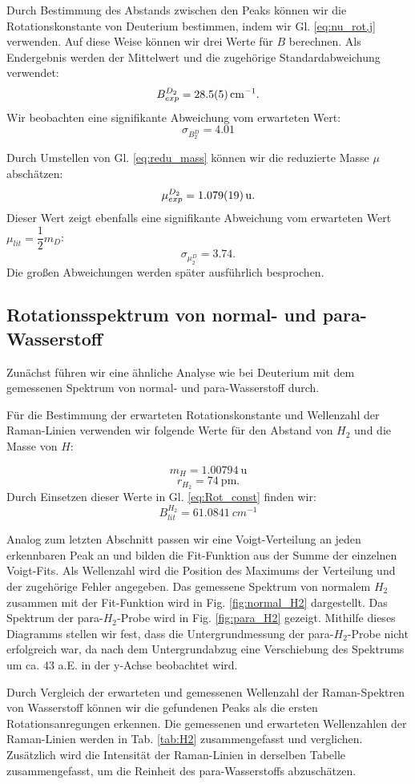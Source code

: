 \documentclass[11pt]{article}
\begin{document}
Durch Bestimmung des Abstands zwischen den Peaks können wir die Rotationskonstante von Deuterium bestimmen, indem wir Gl. \ref{eq:nu_rot,j} verwenden. Auf diese Weise können wir drei Werte für $B$ berechnen. Als Endergebnis werden der Mittelwert und die zugehörige Standardabweichung verwendet: 
$$B_{exp}^{D_2} = \SI{28.5\pm 0.5}{cm^{-1}}.$$
Wir beobachten eine signifikante Abweichung vom erwarteten Wert:
$$\sigma_{B^D_2} = 4.01$$ 
 
Durch Umstellen von Gl. \ref{eq:redu_mass} können wir die reduzierte Masse $\mu$ abschätzen:
$$\mu_{exp}^{D_2} = \SI{1.079\pm 0.019}{\atomicmassunit}.$$
Dieser Wert zeigt ebenfalls eine signifikante Abweichung vom erwarteten Wert $\mu_{lit} = \dfrac{1}{2}m_D$:
$$\sigma_{\mu^D_2} = 3.74.$$
Die großen Abweichungen werden später ausführlich besprochen.

\subsection{Rotationsspektrum von normal- und para-Wasserstoff}
Zunächst führen wir eine ähnliche Analyse wie bei Deuterium mit dem gemessenen Spektrum von normal- und para-Wasserstoff durch.

Für die Bestimmung der erwarteten Rotationskonstante und Wellenzahl der Raman-Linien verwenden wir folgende Werte für den Abstand von $H_2$ und die Masse von $H$:

$$m_{H} =\SI{1.00794}{\atomicmassunit}$$
$$r_{H_2} = \SI{74}{\pm}.$$
Durch Einsetzen dieser Werte in Gl. \ref{eq:Rot_const} finden wir:
$$B_{lit}^{H_2} = \SI{61.0841}{cm^{-1}} $$

Analog zum letzten Abschnitt passen wir eine Voigt-Verteilung an jeden erkennbaren Peak an und bilden die Fit-Funktion aus der Summe der einzelnen Voigt-Fits. Als Wellenzahl wird die Position des Maximums der Verteilung und der zugehörige Fehler angegeben. Das gemessene Spektrum von normalem $H_2$ zusammen mit der Fit-Funktion wird in Fig. \ref{fig:normal_H2} dargestellt. Das Spektrum der para-$H_2$-Probe wird in Fig. \ref{fig:para_H2} gezeigt. Mithilfe dieses Diagramms stellen wir fest, dass die Untergrundmessung der para-$H_2$-Probe nicht erfolgreich war, da nach dem Untergrundabzug eine Verschiebung des Spektrums um ca. 43 a.E. in der y-Achse beobachtet wird.

Durch Vergleich der erwarteten und gemessenen Wellenzahl der Raman-Spektren von Wasserstoff können wir die gefundenen Peaks als die ersten Rotationsanregungen erkennen. Die gemessenen und erwarteten Wellenzahlen der Raman-Linien werden in Tab. \ref{tab:H2} zusammengefasst und verglichen. Zusätzlich wird die Intensität der Raman-Linien in derselben Tabelle zusammengefasst, um die Reinheit des para-Wasserstoffs abzuschätzen.
\end{document}
